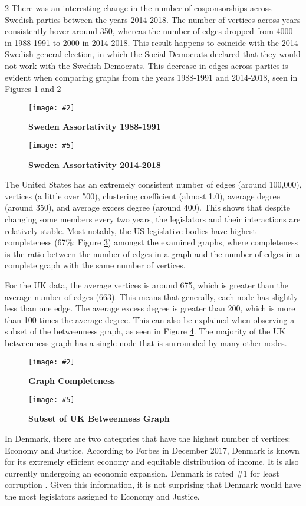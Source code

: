 \documentclass[12pt]{article}
\newcommand{\doubleimage}[7]{
  \begin{figure*}[t]
    \centering
    \begin{subfigure}{.5\textwidth}
      \centering
      \texttt{[image: \#2]}
      \caption[(details)]{\textbf{#4}\label{fig:#3}}
    \end{subfigure}%
    \begin{subfigure}{.5\textwidth}
      \centering
      \texttt{[image: \#5]}
      \caption[(details)]{\textbf{#7}\label{fig:#6}}
    \end{subfigure}
    \begin{center}
      \caption{\textbf{#1}}
    \end{center}
    \vspace{-2em}
  \end{figure*}
}
\begin{document}
\begin{multicols*}{2}
There was an interesting change in the number of cosponsorships across Swedish parties between the years 2014-2018. The number of vertices across years consistently hover around 350, whereas the number of edges dropped from 4000 in 1988-1991 to 2000 in 2014-2018. This result happens to coincide with the 2014 Swedish general election, in which the Social Democrats declared that they would not work with the Swedish Democrats. This decrease in edges across parties is evident when comparing graphs from the years 1988-1991 and 2014-2018, seen in Figures \ref{fig:swe_ass_1988} and \ref{fig:swe_ass_2014}

\doubleimage
{}{../plots/graph/sweden/assortativity/assortativity_net_se1988-1991.pdf}{swe_ass_1988}{Sweden Assortativity 1988-1991}{../plots/graph/sweden/assortativity/assortativity_net_se2014-2018.pdf}{swe_ass_2014}{Sweden Assortativity 2014-2018}

The United States has an extremely consistent number of edges (around 100,000), vertices (a little over 500), clustering coefficient (almost 1.0), average degree (around 350), and average excess degree (around 400). This shows that despite changing some members every two years, the legislators and their interactions are relatively stable. Most notably, the US legislative bodies have highest completeness (67\%; Figure \ref{fig:completeness}) amongst the examined graphs, where completeness is the ratio between the number of edges in a graph and the number of edges in a complete graph with the same number of vertices.

For the UK data, the average vertices is around 675, which is greater than the average number of edges (663). This means that generally, each node has slightly less than one edge. The average excess degree is greater than 200, which is more than 100 times the average degree. This can also be explained when observing a subset of the betweenness graph, as seen in Figure \ref{fig:uk-betweenness}. The majority of the UK betweenness graph has a single node that is surrounded by many other nodes. 

\doubleimage{}{../plots/averages/completeness.pdf}{completeness}{Graph Completeness}{Images/uk-betweenness.png}{uk-betweenness}{Subset of UK Betweenness Graph}

In Denmark, there are two categories that have the highest number of vertices: Economy and Justice. According to Forbes in December 2017, Denmark is known for its extremely efficient economy and equitable distribution of income. It is also currently undergoing an economic expansion. Denmark is rated \#1 for least corruption \cite{denmark}. Given this information, it is not surprising that Denmark would have the most legislators assigned to Economy and Justice.


\end{multicols*}
\end{document}
